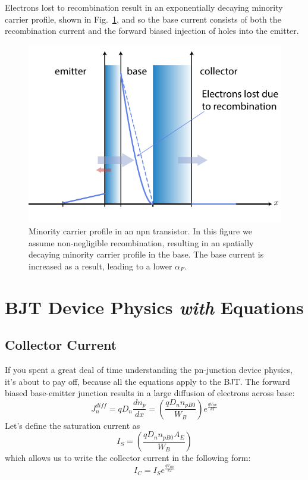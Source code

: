 Electrons lost to recombination result in an exponentially decaying minority carrier profile, shown in Fig.~\ref{fig:slide12_alpha_f}, and so the base current consists of both the recombination current and the forward biased  injection of holes into the emitter. 

 
\begin{figure}[tb]
\begin{center}
\includegraphics[width=.75\columnwidth]{slide12_alpha_f}
\end{center}
\caption{Minority carrier profile in an npn transistor.  In this figure we assume non-negligible recombination, resulting in an spatially decaying minority carrier profile in the base.  The base current is increased as a result, leading to a lower $\alpha_F$.} \label{fig:slide12_alpha_f}
\end{figure}






\section{BJT Device Physics \emph{with} Equations}



\subsection{Collector Current}

If you spent a great deal of time understanding the pn-junction device physics, it's about to pay off, because all the equations apply to the BJT.   The forward biased base-emitter junction results in a large diffusion of electrons across base:
% 
\begin{equation}
	J_n^{diff} = q{D_n}\frac{{d{n_p}}}{{dx}} = \left( {\frac{{q{D_n}{n_{pB0}}}}{{{W_B}}}} \right)	{e^{\frac{{q{V_{BE}}}}{{kT}}}}
\end{equation}
%
Let's define the saturation current as
%
\begin{equation}
	{I_S} = \left( {\frac{{q{D_n}{n_{pB0}}{A_E}}}{{{W_B}}}} \right)
\end{equation}
%
which allows us to write the collector current in the following form:
%
\begin{equation}
	{I_C} = {I_S}{e^{\frac{{q{V_{BE}}}}{{kT}}}}
\end{equation}



